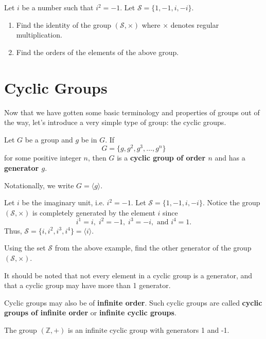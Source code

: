 \begin{exercise}
    Let $i$ be a number such that $i^2 = -1$. Let $\mathcal{S} = \{1, -1, i, -i\}$.
    \begin{enumerate}[label=(\roman*)]
        \item Find the identity of the group $(\mathcal{S}, \times)$ where $\times$ denotes regular multiplication.
        \item Find the orders of the elements of the above group.
    \end{enumerate}
\end{exercise}

\newpage

\section{Cyclic Groups}
Now that we have gotten some basic terminology and properties of groups out of the way, let's introduce a very simple type of group: the cyclic groups.

\begin{definition}
    Let $G$ be a group and $g$ be in $G$. If
    \[
        G = \{g, g^2, g^3, \dots, g^n\}
    \]
    for some positive integer $n$, then $G$ is a \textbf{cyclic group of order $n$} and has a \textbf{generator $g$}.
\end{definition}
Notationally, we write $G = \langle g \rangle$.

\begin{example}
    Let $i$ be the imaginary unit, i.e. $i^2 = -1$. Let $\mathcal{S} = \{1, -1, i, -i\}$. Notice the group $(\mathcal{S}, \times)$ is completely generated by the element $i$ since
    \[
    i^1 = i,\; i^2 = -1,\; i^3 = -i, \text{ and } i^4 = 1.
    \]
    Thus, $\mathcal{S} = \{i, i^2, i^3, i^4\} = \langle i \rangle$.
\end{example}

\begin{exercise}
    Using the set $\mathcal{S}$ from the above example, find the other generator of the group $(\mathcal{S}, \times)$.
\end{exercise}

It should be noted that not every element in a cyclic group is a generator, and that a cyclic group may have more than 1 generator.

Cyclic groups may also be of \textbf{infinite order}. Such cyclic groups are called \textbf{cyclic groups of infinite order} or \textbf{infinite cyclic groups}.
\begin{example}
    The group $(\mathbb{Z}, +)$ is an infinite cyclic group with generators 1 and -1.
\end{example}

